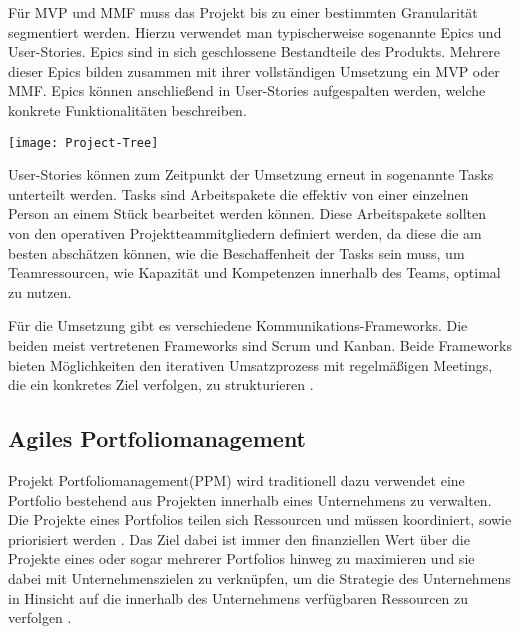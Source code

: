 Für MVP und MMF muss das Projekt bis zu einer bestimmten Granularität segmentiert werden. Hierzu verwendet man typischerweise sogenannte Epics und User-Stories. Epics sind in sich geschlossene Bestandteile des Produkts. Mehrere dieser Epics bilden zusammen mit ihrer vollständigen Umsetzung ein MVP oder MMF. Epics können anschließend in User-Stories aufgespalten werden, welche konkrete Funktionalitäten beschreiben. \cite{agilesProjektmanagementImBerufsalltagEpicsUndUserStories}

\vspace{20pt}
\begin{center}
    \begin{minipage}{0.8\linewidth}
        \texttt{[image: Project-Tree]}
    \end{minipage}
\end{center}
\vspace{20pt}

User-Stories können zum Zeitpunkt der Umsetzung erneut in sogenannte Tasks unterteilt werden. Tasks sind Arbeitspakete die effektiv von einer einzelnen Person an einem Stück bearbeitet werden können. Diese Arbeitspakete sollten von den operativen Projektteammitgliedern definiert werden, da diese die am besten abschätzen können, wie die Beschaffenheit der Tasks sein muss, um Teamressourcen, wie Kapazität und Kompetenzen innerhalb des Teams, optimal zu nutzen. \cite{agilesProjektmanagementImBerufsalltagEpicsUndUserStories}

Für die Umsetzung gibt es verschiedene Kommunikations-Frameworks. Die beiden meist vertretenen Frameworks sind Scrum und Kanban. Beide Frameworks bieten Möglichkeiten den iterativen Umsatzprozess mit regelmäßigen Meetings, die ein konkretes Ziel verfolgen, zu strukturieren \cite{}.

\subsection{Agiles Portfoliomanagement}
Projekt Portfoliomanagement(PPM) wird traditionell dazu verwendet eine Portfolio bestehend aus Projekten innerhalb eines Unternehmens zu verwalten. Die Projekte eines Portfolios teilen sich Ressourcen und müssen koordiniert, sowie priorisiert werden \cite{NGUYEN20181054}.
Das Ziel dabei ist immer den finanziellen Wert über die Projekte eines oder sogar mehrerer Portfolios hinweg zu maximieren und sie dabei mit Unternehmenszielen zu verknüpfen, um die Strategie des Unternehmens in Hinsicht auf die innerhalb des Unternehmens verfügbaren Ressourcen zu verfolgen \cite{MARTINSUO200756}.

